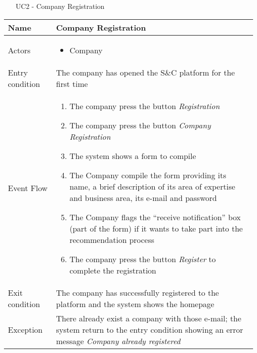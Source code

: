 			
		
			
			\begin{table} [H]
				\centering
					\begin{itemize}
					\item [UC2] - Company Registration
				\end{itemize}
				\begin{tabular}{|| P{7.5cm} | P{7.5cm} ||}
					\hline
					Name & Company Registration \\
					\hline
					Actors & \parbox{5cm}{\begin{itemize}
							\item Company
						\end{itemize}
					} \\
					\hline
					Entry condition & The company has opened the S\&C platform for the first time \\
					\hline
					Event Flow & \parbox{5cm}{\begin{enumerate}
							\item The company press the button \textit{Registration}
							\item The company press the button \textit{Company Registration}
							\item The system shows a form to compile
							\item The Company compile the form 
							providing its name, a brief description 
							of its area of expertise and business 
							area, its e-mail and password
							\item The Company flags the “receive 
							notification” box (part of the form) if it 
							wants to take part into the recommendation process
							\item The company press the button 
							\textit{Register} to complete the 
							registration
					\end{enumerate}} \\
					\hline 
					Exit condition & The company has successfully registered 
					to the platform and the system shows the 
					homepage \\
					\hline
					Exception & There already exist a company with 
					those e-mail; the system return to 
					the entry condition showing an 
					error message \textit{Company already 
						registered} \\
					\hline
				\end{tabular}
			\end{table}
			
		
			
